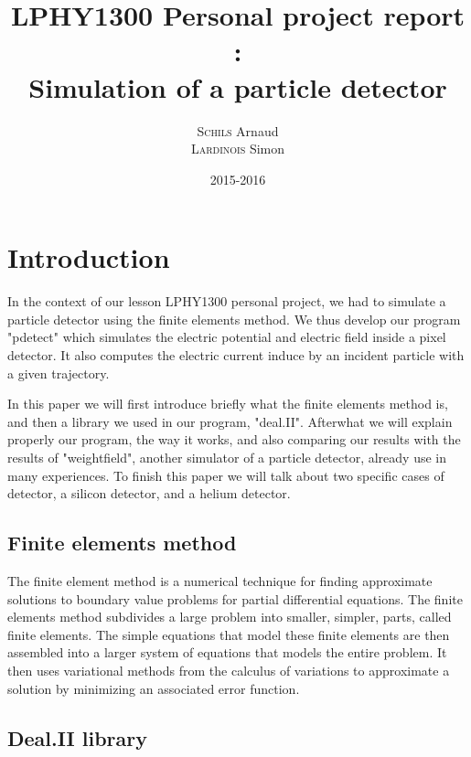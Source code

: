 \documentclass[11pt]{article}
\title{LPHY1300 Personal project report :\\ Simulation of a particle detector}
\author{\textsc{Schils} Arnaud\\ \textsc{Lardinois} Simon}
\date{2015-2016}
\begin{document}
\maketitle
\newpage
\renewcommand{\contentsname}{Table of contents}
\tableofcontents

\newpage
\section{Introduction}
	
	\hspace{0.6cm}In the context of our lesson LPHY1300 personal project, we 
	had to simulate a particle detector using the finite elements method. We 
	thus develop our program "pdetect" which simulates the electric potential 
	and electric field inside a pixel detector. It also computes the electric 
	current induce by an incident particle with a given trajectory.

	In this paper we will first introduce briefly what the finite elements 
	method is, and then a library we used in our program, "deal.II".
	Afterwhat we will explain properly our program, the way it works, and 
	also comparing our results with the results of "weightfield", another 
	simulator of a particle detector, already use in many experiences.
	To finish this paper we will talk about two specific cases of detector,
	a silicon detector, and a helium detector.

	\subsection*{Finite elements method}

		\hspace{0.6cm}The finite element method is a numerical technique for 
		finding approximate solutions to boundary value problems for partial 
		differential equations. The finite elements method subdivides a large 
		problem into smaller, simpler, parts, called finite elements. The 
		simple equations that model these finite elements are then assembled 
		into a larger system of equations that models the entire problem. It 
		then uses variational methods from the calculus of variations to 
		approximate a solution by minimizing an associated error function.

	\subsection*{Deal.II library}
\end{document}
